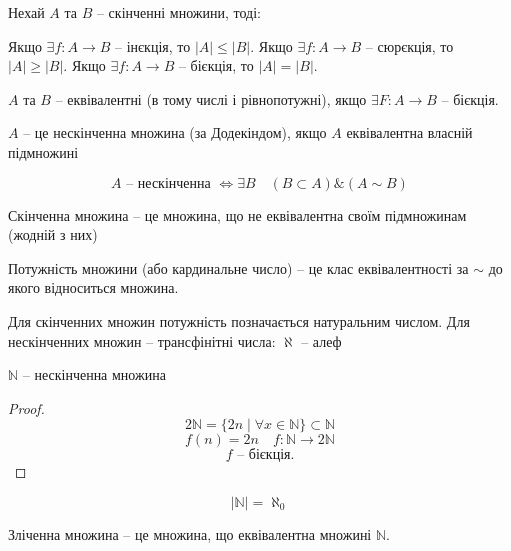 \begin{theorem}[Теорема Ф]
    Нехай $A$ та $B$ -- скінченні множини, тоді:
    
    Якщо $\exists f: A \rightarrow B$ -- інєкція, то $|A| \leqslant |B|$.
    Якщо $\exists f: A \rightarrow B$ -- сюрєкція, то $|A| \geqslant |B|$.
    Якщо $\exists f: A \rightarrow B$ -- бієкція, то $|A| = |B|$.
\end{theorem}

\begin{theorem}
    $A$ та $B$ -- еквівалентні (в тому числі і рівнопотужні),
    якщо $\exists F: A \rightarrow B$ -- бієкція.
\end{theorem}

\begin{definition}
    $A$ -- це нескінченна множина (за Додекіндом),
    якщо $A$ еквівалентна власній підмножині
    
    $$ A \text{ -- нескінченна } \Leftrightarrow \exists B \quad (B \subset A) \& (A \sim B)$$
\end{definition}

\begin{definition}
    Скінченна множина -- це множина, що не 
    еквівалентна своїм підмножинам (жодній з них)
\end{definition}

\begin{definition}
    Потужність множини (або кардинальне число) -- це клас
    еквівалентності за $\sim$ до якого відноситься множина.
\end{definition}

Для скінченних множин потужність позначається
натуральним числом.
Для нескінченних множин -- трансфінітні числа: $\aleph$ -- алеф

\begin{claim}
    $\mathbb{N}$ -- нескінченна множина
\end{claim}
\begin{proof}
    $$2 \mathbb{N} = \{ 2n \mid \forall x \in \mathbb{N} \} \subset \mathbb{N}$$
    $$f(n) = 2n \quad f: \mathbb{N} \rightarrow 2\mathbb{N}$$
    $$f \text{ -- бієкція.}$$
\end{proof}

\begin{remark}
    $$|\mathbb{N}| = \aleph_0$$
\end{remark}

\begin{definition}
    Зліченна множина -- це множина, що еквівалентна множині $\mathbb{N}$.
\end{definition}

